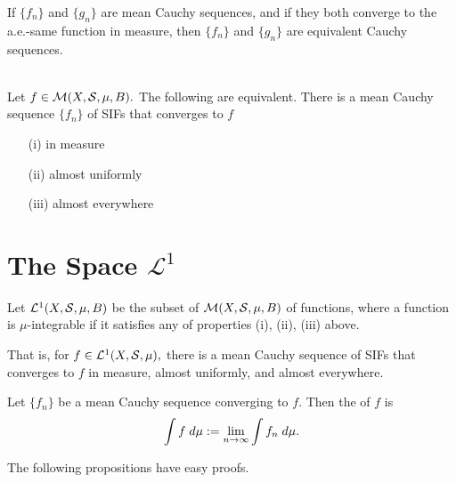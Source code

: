 \begin{prop}
If $\{f_n\}$ and $\{g_n\}$ are mean Cauchy sequences, and if they both converge to the a.e.-same function in measure, then $\{f_n\}$ and $\{g_n\}$ are equivalent Cauchy sequences. \\ \\
\end{prop}

\begin{thm}
Let $f\in\mathcal{M}(X,\mathcal{S},\mu,B).$ The following are equivalent. There is a mean Cauchy sequence $\{f_n\}$ of SIFs that converges to $f$
\begin{enumerate}
\item[(i)] in measure
\item[(ii)] almost uniformly
\item[(iii)] almost everywhere
\end{enumerate}
\end{thm}

\section{The Space $\mathcal{L}^1$}
\begin{defn}
Let $\mathcal{L}^1(X,\mathcal{S},\mu,B)$ be the subset of $\mathcal{M}(X,\mathcal{S},\mu,B)$ of  functions, where a function is $\mu$-integrable if it satisfies any of properties (i), (ii), (iii) above.
\end{defn}

\noindent That is, for $f\in\mathcal{L}^1(X,\mathcal{S},\mu),$ there is a mean Cauchy sequence of SIFs that converges to $f$ in measure, almost uniformly, and almost everywhere.

\begin{defn}
Let $\{f_n\}$ be a mean Cauchy sequence converging to $f.$ Then the  of $f$ is
$$\displaystyle\int f\;d\mu:=\lim\limits_{n\rightarrow\infty}\displaystyle\int f_n\;d\mu.$$
\end{defn}

\noindent The following propositions have easy proofs. 

